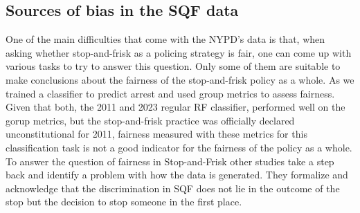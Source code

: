 \subsection{Sources of bias in the SQF data}
One of the main difficulties that come with the NYPD's data is that, when asking whether stop-and-frisk as a policing strategy is fair, one can come up with various tasks to try to answer this question. Only some of them are suitable to make conclusions about the fairness of the stop-and-frisk policy as a whole. As \cite{Badr2022DTFANSP} we trained a classifier to predict arrest and used group metrics to assess fairness. Given that both, the 2011 and 2023 regular RF classifier, performed well on the gorup metrics, but the stop-and-frisk practice was officially declared unconstitutional for 2011, fairness measured with these metrics for this classification task is not a good indicator for the fairness of the policy as a whole.\\
To answer the question of fairness in Stop-and-Frisk other studies take a step back and identify a problem with how the data is generated. They formalize and acknowledge that the discrimination in SQF does not lie in the outcome of the stop but the decision to stop someone in the first place.\\

